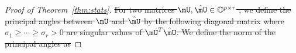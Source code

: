\documentclass[lettersize,onecolumn,journal]{IEEEtran}
\theoremstyle{definition}
\theoremstyle{definition}
\newtheorem{defn}{Definition}
\newcommand{\of}[1]{\left(#1\right)}
\def\fixme#1#2{\textbf{\color{red}[FIXME (#1): #2]}}
\providecommand{\DIFdeltex}[1]{{\protect\color{red}\sout{#1}}}                      %
\providecommand{\DIFdel}[1]{\texorpdfstring{\DIFdeltex{#1}}{}} %
\begin{document}
\begin{proof}[Proof of Theorem~\ref{thm:stats}]
\DIFdel{For two matrices $\mU, \hat \mU \in \mathbb{O}^{p \times r}$ %
, we define the principal angles between $\mU$ and $\hat \mU$ by the following diagonal matrix
}%
\DIFdel{where $\sigma_1 \geq \cdots \geq \sigma_r>0$ are singular values of $\mU^T \hat \mU$. 
We define the norm of the principal angles as 
}%





\end{proof}
\end{document}
